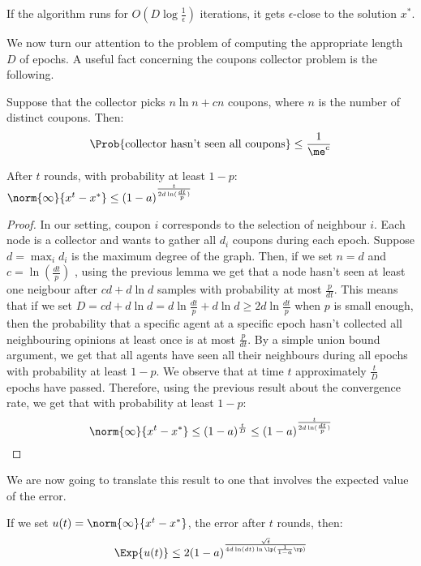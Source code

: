 \begin{corollary}
If the algorithm runs for $O(D \log \frac{1}{\epsilon})$ iterations, it gets $\epsilon$-close to the solution $x^*$.
\end{corollary}

We now turn our attention to the problem of computing the appropriate length $D$ of epochs. A useful fact concerning the coupons collector problem is the following.

\begin{lemma}
Suppose that the collector picks $n\ln n + cn$ coupons, where $n$ is the number of distinct coupons. Then:
$$
\Prob{\text{collector hasn't seen all coupons}} \leq \frac{1}{\me^c}
$$
\end{lemma}

\begin{theorem}
After $t$ rounds, with probability at least $1 - p$: $\norm{\infty}{x^{t}-x^*} \leq (1-a)^{\frac{t}{2d\ln( \frac{dt}{p})} }$
\end{theorem}
\begin{proof}
In our setting, coupon $i$ corresponds to the selection of neighbour $i$. 
Each node is a collector and wants to gather all $d_i$ coupons during each epoch. 
Suppose $d = \max_i d_i$ is the maximum degree of the graph. Then, if we set $n = d$ and $c = \ln (\frac{dt}{p})$ , 
using the previous lemma we get that a node hasn't seen at least one neigbour after $cd + d\ln d$ samples with probability at most $\frac{p}{dt}$. 
This means that if we set $D = cd + d\ln d = d \ln \frac{dt}{p} + d \ln d \geq 2d\ln\frac{dt}{p} $ when $p$ is small enough, 
then the probability that a specific agent at a specific epoch hasn't collected all neighbouring opinions at least once is at most $\frac{p}{dt}$. 
By a simple union bound argument, we get that all agents have seen all their neighbours during all epochs with probability at least $1 - p$. 
We observe that at time $t$ approximately $\frac{t}{D}$ epochs have passed. 
Therefore, using the previous result about the convergence rate, we get that with probability at least $1 - p$:
$$ \norm{\infty}{x^{t}-x^*} \leq (1-a)^{\frac{t}{D}} \leq (1-a)^{\frac{t}{2d\ln( \frac{dt}{p})} }$$

\end{proof}
We are now going to translate this result to one that involves the expected value of the error.
\begin{theorem}If we set $u(t) = \norm{\infty}{x^t-x^*}$, the error after $t$ rounds, then:
$$
\Exp{u(t)} \leq 2(1-a)^{\frac{\sqrt{t}}{4d\ln(dt)\ln\lp( \frac{1}{1-a}\rp)}}
$$
\end{theorem}
